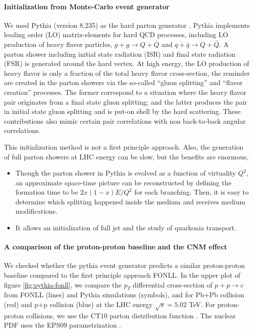 \paragraph{Initialization from Monte-Carlo event generator}
We used Pythia (version 8.235) as the hard parton generator \cite{Sjostrand:2014zea, Sjostrand:2006za}.
Pythia implements leading order (LO) matrix-elements for hard QCD processes, including LO production of heavy flavor particles,
$g+g\rightarrow Q+\bar{Q}$ and $q+\bar{q}\rightarrow Q+\bar{Q}$.
A parton shower including initial state radiation (ISR) and final state radiation (FSR) is generated around the hard vertex.
At high energy, the LO production of heavy flavor is only a fraction of the total heavy flavor cross-section, the reminder are created in the parton showers via the so-called ``gluon splitting'' and ``flavor creation'' processes.
The former correspond to a situation where the heavy flavor pair originates from a final state gluon splitting; and the latter produces the pair in initial state gluon splitting and is put-on shell by the hard scattering.
These contributions also mimic certain pair correlations with non back-to-back angular correlations.

This initialization method is not a first principle approach. 
Also, the generation of full parton showers at LHC energy can be slow, but the benefits are enormous,
\begin{itemize}
\item Though the parton shower in Pythia is evolved as a function of virtuality $Q^2$, an approximate space-time picture can be reconstructed by defining the formation time to be $2x(1-x)E/Q^2$ for each branching. Then, it is easy to determine which splitting happened inside the medium and receives medium modifications.
\item It allows an initialization of full jet and the study of quarkonia transport.
\end{itemize}

\paragraph{A comparison of the proton-proton baseline and the CNM effect}
We checked whether the pythia event generator predicts a similar proton-proton baseline compared to the first principle approach FONLL.
In the upper plot of figure \ref{fig:pythia-fonll}, we compare the $p_T$ differential cross-section of $p+p\rightarrow c$ from FONLL (lines) and Pythia simulations (symbols), and for Pb+Pb collision (red) and p+p collision (blue) at the LHC energy $\sqrt{s}=5.02$ TeV.
For proton-proton collisions, we use the CT10 parton distribution function \cite{Lai:2010vv}.
The nuclear PDF uses the EPS09 parametrization \cite{Eskola:2009uj}.

